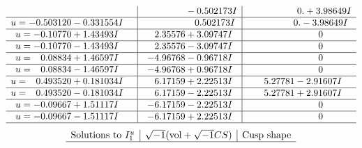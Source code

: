 \documentclass[1p]{elsarticle_modified}
\theoremstyle{definition}
\newcommand{\I}{\sqrt{-1}}
\begin{document}
$$\begin{array}{c|c|c}
 & \phantom{-0.000000 } -0.502173 I & \phantom{-0.000000 -}0. + 3.98649 I \\ \hline\begin{aligned}
u &= -0.503120 - 0.331554 I\end{aligned}
 & \phantom{-0.000000 -}0.502173 I & \phantom{-0.000000 } 0. - 3.98649 I \\ \hline\begin{aligned}
u &= -0.10770 + 1.43493 I\end{aligned}
 & \phantom{-}2.35576 + 3.09747 I & \phantom{-0.000000 } 0 \\ \hline\begin{aligned}
u &= -0.10770 - 1.43493 I\end{aligned}
 & \phantom{-}2.35576 - 3.09747 I & \phantom{-0.000000 } 0 \\ \hline\begin{aligned}
u &= \phantom{-}0.08834 + 1.46597 I\end{aligned}
 & -4.96768 - 0.96718 I & \phantom{-0.000000 } 0 \\ \hline\begin{aligned}
u &= \phantom{-}0.08834 - 1.46597 I\end{aligned}
 & -4.96768 + 0.96718 I & \phantom{-0.000000 } 0 \\ \hline\begin{aligned}
u &= \phantom{-}0.493520 + 0.181034 I\end{aligned}
 & \phantom{-}6.17159 + 2.22513 I & \phantom{-}5.27781 - 2.91607 I \\ \hline\begin{aligned}
u &= \phantom{-}0.493520 - 0.181034 I\end{aligned}
 & \phantom{-}6.17159 - 2.22513 I & \phantom{-}5.27781 + 2.91607 I \\ \hline\begin{aligned}
u &= -0.09667 + 1.51117 I\end{aligned}
 & -6.17159 - 2.22513 I & \phantom{-0.000000 } 0 \\ \hline\begin{aligned}
u &= -0.09667 - 1.51117 I\end{aligned}
 & -6.17159 + 2.22513 I & \phantom{-0.000000 } 0\\
 \hline 
 \end{array}$$\newpage$$\begin{array}{c|c|c}  
\text{Solutions to }I^u_{1}& \I (\text{vol} + \sqrt{-1}CS) & \text{Cusp shape}\\
 \hline 

\end{array}$$
\end{document}
